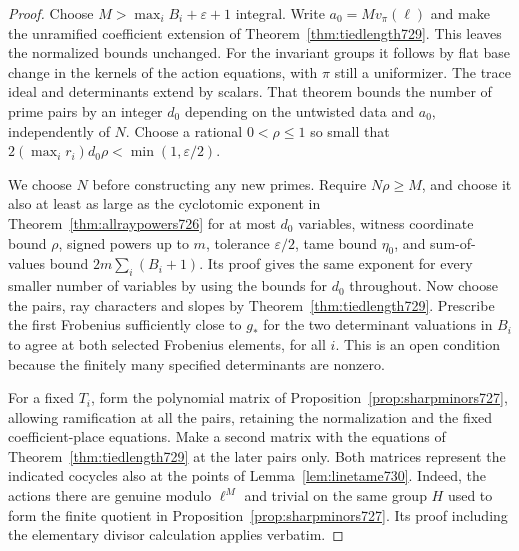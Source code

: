 \documentclass[a4paper,11pt]{article}
\theoremstyle{definition}
\theoremstyle{remark}
\numberwithin{equation}{section}
\begin{document}
\begin{proof}
Choose \(M>\max_i B_i+\varepsilon+1\) integral. Write
\(a_0=M v_\pi(\ell)\) and make the unramified coefficient extension
of Theorem~\ref{thm:tiedlength729}. This leaves the normalized bounds
unchanged. For the invariant groups it follows by flat base change
in the kernels of the action equations, with \(\pi\) still a
uniformizer. The trace ideal and determinants extend by scalars.
That theorem bounds the number of prime pairs by an integer \(d_0\)
depending on the untwisted data and \(a_0\), independently of \(N\).
Choose a rational \(0<\rho\le1\) so small that
\(2(\max_i r_i)d_0\rho<\min(1,\varepsilon/2)\).

We choose \(N\) before constructing any new primes. Require
\(N\rho\ge M\), and choose it also at least as large as the
cyclotomic exponent in Theorem~\ref{thm:allraypowers726} for at most
\(d_0\) variables, witness coordinate bound \(\rho\), signed powers
up to \(m\), tolerance \(\varepsilon/2\), tame bound \(\eta_0\), and
sum-of-values bound \(2m\sum_i(B_i+1)\). Its proof gives the same
exponent for every smaller number of variables by using the bounds
for \(d_0\) throughout. Now choose the pairs, ray characters and
slopes by Theorem~\ref{thm:tiedlength729}. Prescribe the first
Frobenius sufficiently close to \(g_*\) for the two determinant
valuations in \(B_i\) to agree at both selected Frobenius elements,
for all \(i\). This is an open condition because the finitely many
specified determinants are nonzero.

For a fixed \(T_i\), form the polynomial matrix of
Proposition~\ref{prop:sharpminors727}, allowing ramification at all
the pairs, retaining the normalization and the fixed coefficient-place
equations. Make a second matrix with the equations of
Theorem~\ref{thm:tiedlength729} at the later pairs only.
Both matrices represent the indicated cocycles also at the points of
Lemma~\ref{lem:linetame730}. Indeed, the actions there are genuine
modulo \(\ell^M\) and trivial on the same group \(H\) used to form the
finite quotient in Proposition~\ref{prop:sharpminors727}. Its proof
including the elementary divisor calculation applies verbatim.


\end{proof}
\end{document}
